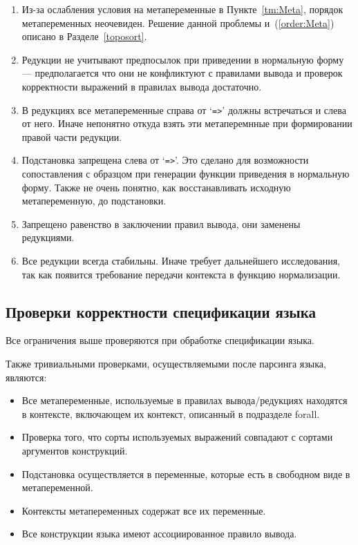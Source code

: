 \begin{enumerate}
\item Из-за ослабления условия на метапеременные в Пункте~\ref{tm:Meta}, порядок метапеременных неочевиден. Решение данной проблемы и~(\ref{order:Meta}) описано в Разделе~\ref{toposort}.

\item Редукции не учитывают предпосылок при приведении в нормальную форму --- предполагается что они не конфликтуют с правилами вывода и проверок корректности выражений в правилах вывода достаточно.

\item В редукциях все метапеременные справа от `\lstinline{=>}' должны встречаться и слева от него. Иначе непонятно откуда взять эти метаперемнные при формировании правой части редукции.

\item Подстановка запрещена слева от `\lstinline{=>}'. Это сделано для возможности сопоставления с образцом при генерации функции приведения в нормальную форму. Также не очень понятно, как восстанавливать исходную метапеременную, до подстановки.

\item Запрещено равенство в заключении правил вывода, они заменены редукциями.

\item Все редукции всегда стабильны. Иначе требует дальнейшего исследования, так как появится требование передачи контекста в функцию нормализации.

\end{enumerate}

\subsection{Проверки корректности спецификации языка}

Все ограничения выше проверяются при обработке спецификации языка.

Также тривиальными проверками, осуществляемыми после парсинга языка, являются:
\begin{itemize}
\item Все метапеременные, используемые в правилах вывода/редукциях находятся в контексте, включающем их контекст, описанный в подразделе forall.
\item Проверка того, что сорты используемых выражений совпадают с сортами аргументов конструкций.
\item Подстановка осуществляется в переменные, которые есть в свободном виде в метапеременной.
\item Контексты метапеременных содержат все их переменные.
\item Все конструкции языка имеют ассоциированное правило вывода.
\end{itemize}

